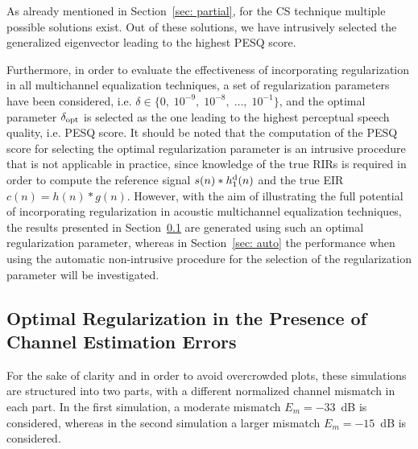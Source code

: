 \documentclass[10pt]{IEEEtran}
\begin{document}
As already mentioned in Section~\ref{sec: partial}, for the CS technique multiple possible solutions exist.
Out of these solutions, we have intrusively selected the generalized eigenvector leading to the highest PESQ score.


Furthermore, in order to evaluate the effectiveness of incorporating regularization in all multichannel equalization techniques, a set of regularization parameters have been considered, i.e. $\delta \in \{0, \; 10^{-9}, \; 10^{-8}, \; \ldots, \; 10^{-1} \}$, and the optimal parameter $\delta_{\rm opt}$ is selected as the one leading to the highest perceptual speech quality, i.e. PESQ score.
It should be noted that the computation of the PESQ score for selecting the optimal regularization parameter is an intrusive procedure that is not applicable in practice, since knowledge of the true RIRs is required in order to compute the reference signal $s(n) \ast h_1^{\rm d}(n)$ and the true EIR $c(n) = h(n) \ast g(n)$.
However, with the aim of illustrating the full potential of incorporating regularization in acoustic multichannel equalization techniques, the results presented in Section~\ref{sec: regacsys} are generated using such an optimal regularization parameter, whereas in Section~\ref{sec: auto} the performance when using the automatic non-intrusive procedure for the selection of the regularization parameter will be investigated.

\subsection{Optimal Regularization in the Presence of Channel Estimation Errors}
\label{sec: regacsys}
For the sake of clarity and in order to avoid overcrowded plots, these simulations are structured into two parts, with a different normalized channel mismatch in each part.
In the first simulation, a moderate mismatch $E_m = -33$~dB is considered, whereas in the second simulation a larger mismatch $E_m = -15$~dB is considered.
\end{document}
